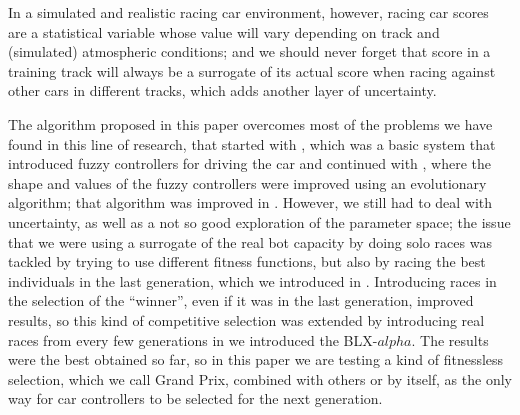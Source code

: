 \documentclass[10pt,journal,compsoc]{IEEEtran}
\begin{document}
\IEEEdisplaynontitleabstractindextext
\IEEEpeerreviewmaketitle





In a simulated and
    realistic racing car environment, however, racing car scores are a
    statistical variable whose value will vary depending on track and
    (simulated) atmospheric conditions; and we should never forget
    that score in a training track will always be a surrogate of its
    actual score when racing against other cars in different tracks,
    which adds another layer of uncertainty.




The algorithm proposed in this paper overcomes most of the problems we
have found in this line of research, that started with
\cite{DBLP:conf/evoW/SalemMMG17}, which was a basic system that
introduced fuzzy controllers for driving the car and continued with
\cite{10.1007/978-3-319-77538-8_24}, where the shape and values of the
fuzzy controllers were improved using an evolutionary algorithm; that
algorithm was improved in \cite{DBLP:conf/ipmu/SalemMGG18}. However,
we still had to deal with uncertainty, as well as a not so good
exploration of the parameter space; the issue that we were using a
surrogate of the real bot capacity by doing solo races was tackled by
trying to use different fitness functions, but also by racing the best
individuals in the last generation, which we introduced in
\cite{salem_cig2018}. Introducing races in the selection of the
``winner'', even if it was in the last generation, improved results,
so this kind of competitive selection was extended by introducing real
races from every few generations in 
\cite{DBLP:conf/cig/SalemMG19} we introduced the BLX-$alpha$. The
results were the best obtained so far, so in this paper we are testing
a kind of fitnessless selection, which we call Grand Prix, combined
with others or by itself, as the only way for car controllers to be
selected for the next generation.
\end{document}
